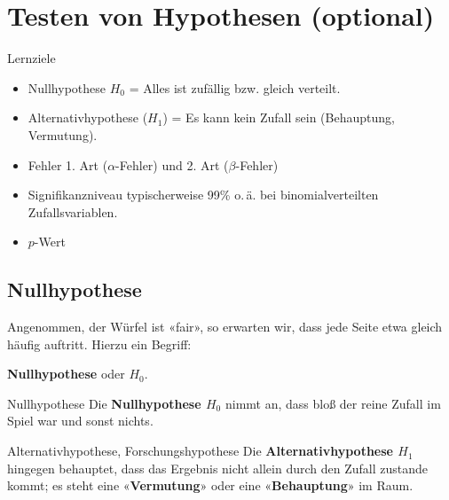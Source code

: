 
\section{Testen von Hypothesen (optional)}


Lernziele

\begin{itemize}
\item Nullhypothese $H_0$ = Alles ist zufällig bzw. gleich verteilt.

\item Alternativhypothese ($H_1$) = Es kann kein Zufall sein
  (Behauptung, Vermutung). 

\item Fehler 1. Art ($\alpha$-Fehler) und 2. Art ($\beta$-Fehler)
  
\item Signifikanzniveau typischerweise 99\%
  o.\,ä. bei binomialverteilten Zufallsvariablen.

\item $p$-Wert
  
\end{itemize}

\newpage

\subsection{Nullhypothese}
Angenommen, der Würfel ist «fair», so erwarten wir, dass jede Seite
etwa gleich häufig auftritt. Hierzu ein Begriff:

\begin{center}\textbf{Nullhypothese} oder {$H_0$}.\end{center}

\begin{definition}{Nullhypothese}{}
Die \textbf{Nullhypothese $H_0$} nimmt an, dass bloß der reine Zufall
im Spiel war und sonst nichts.
\end{definition}

\begin{definition}{Alternativhypothese, Forschungshypothese}{}
Die \textbf{Alternativhypothese $H_1$} hingegen behauptet, dass das
Ergebnis nicht allein durch den Zufall zustande kommt; es steht eine
«\textbf{Vermutung}» oder eine «\textbf{Behauptung}» im Raum. 
\end{definition}



